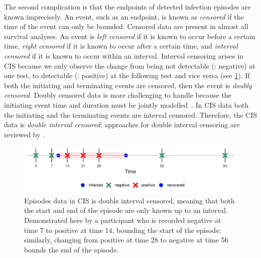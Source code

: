 \documentclass[thesis.tex]{subfiles}
\begin{document}
The second complication is that the endpoints of detected infection episodes are known imprecisely.
An event, such as an endpoint, is known as \emph{censored} if the time of the event can only be bounded.
Censored data are present in almost all survival analyses.
An event is \emph{left censored} if it is known to occur before a certain time, \emph{right censored} if it is known to occur after a certain time, and \emph{interval censored} if it is known to occur within an interval.
Interval censoring arises in CIS because we only observe the change from being not detectable (\ie: negative) at one test, to detectable (\ie: positive) at the following test and vice versa (see \cref{perf-test:fig:double-interval-censor}).
If both the initiating and terminating events are censored, then the event is \emph{doubly censored}.
Doubly censored data is more challenging to handle because the initiating event time and duration must be jointly modelled~\autocite[and references therein]{liSemiparametric}.
In CIS data both the initiating and the terminating events are interval censored.
Therefore, the CIS data is \emph{double interval censored}; approaches for double interval censoring are reviewed by \textcite{sunAnalysis,bogaertsSurvival}.
\begin{figure}
  \centering \includegraphics{cis-perfect-testing/double-interval-censor}
  \caption[Double-interval censoring in CIS data]{Episodes data in CIS is double interval censored, meaning that both the start and end of the episode are only known up to an interval. Demonstrated here by a participant who is recorded negative at time 7 to positive at time 14, bounding the start of the episode; similarly, changing from positive at time 28 to negative at time 56 bounds the end of the episode. \label{perf-test:fig:double-interval-censor}}
\end{figure}
\end{document}
